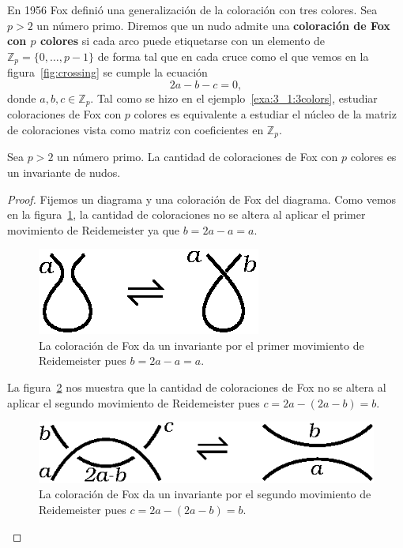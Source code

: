 \documentclass[graybox]{svmult}
\newcommand{\Z}{\mathbb{Z}}
\begin{document}
\label{block:fox}
En 1956 Fox definió una generalización de la coloración con tres colores.
Sea $p>2$ un número primo. Diremos que un nudo admite una \textbf{coloración de
Fox con $p$ colores} si cada arco puede etiquetarse con un elemento de 
$\Z_p=\{0,\dots,p-1\}$ de forma tal que en cada cruce como el que vemos
en la figura~\ref{fig:crossing} se cumple la ecuación
\[
	2a-b-c=0,
\]
donde $a,b,c\in\Z_p$.  Tal como se hizo en el
ejemplo~\ref{exa:3_1:3colors}, estudiar coloraciones de Fox con $p$ colores es
equivalente a estudiar el núcleo de la matriz de coloraciones vista como matriz
con coeficientes en $\Z_p$.

\begin{theorem}
    \label{theorem:fox}
    Sea $p>2$ un número primo.  La cantidad de coloraciones de Fox con $p$ colores es
    un invariante de nudos. 

    \begin{proof}
        Fijemos un diagrama y una coloración de Fox del diagrama. Como vemos en la
        figura~\ref{fig:coloringR1}, la cantidad de coloraciones no se altera al aplicar el
        primer movimiento de Reidemeister ya que $b=2a-a=a$. 

        \begin{figure}[ht]
			\centering
	    	\includegraphics[scale=0.6]{images/coloringR1}
            \caption{La coloración de Fox da un invariante por el primer movimiento
            de Reidemeister pues $b=2a-a=a$.}
            \label{fig:coloringR1}
        \end{figure}

		La figura~\ref{fig:coloringR2} nos muestra que la cantidad de coloraciones de Fox 
		no se altera al aplicar el segundo movimiento de Reidemeister pues
		$c=2a-(2a-b)=b$.
        \begin{figure}[ht]
			\centering
	    	\includegraphics[scale=0.6]{images/coloringR2}
            \caption{La coloración de Fox da un invariante por el segundo movimiento
            de Reidemeister pues $c=2a-(2a-b)=b$.}
            \label{fig:coloringR2}
        \end{figure}


\end{proof}
\end{theorem}
\end{document}
